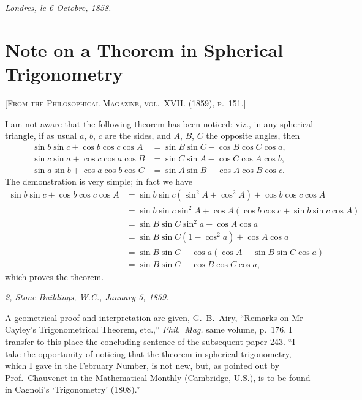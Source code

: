\documentclass[11pt,a4paper]{article}
\begin{document}
\medskip
\noindent\textit{Londres, le 6 Octobre, 1858.}


\newpage


\section{Note on a Theorem in Spherical Trigonometry}
\label{paper:240}

\textsc{[From the Philosophical Magazine, vol.~XVII. (1859), p.~151.]}

\setcounter{page}{80}

I am not aware that the following theorem has been noticed: viz., in any spherical triangle, if as usual $a$, $b$, $c$ are the sides, and $A$, $B$, $C$ the opposite angles, then
\[
\begin{aligned}
\sin b \sin c + \cos b \cos c \cos A &= \sin B \sin C - \cos B \cos C \cos a, \\
\sin c \sin a + \cos c \cos a \cos B &= \sin C \sin A - \cos C \cos A \cos b, \\
\sin a \sin b + \cos a \cos b \cos C &= \sin A \sin B - \cos A \cos B \cos c.
\end{aligned}
\]
The demonstration is very simple; in fact we have
\[
\begin{aligned}
\sin b \sin c + \cos b \cos c \cos A
 &= \sin b \sin c (\sin^{2} A + \cos^{2} A) + \cos b \cos c \cos A \\
 &= \sin b \sin c \sin^{2} A + \cos A (\cos b \cos c + \sin b \sin c \cos A) \\
 &= \sin B \sin C \sin^{2} a + \cos A \cos a \\
 &= \sin B \sin C (1 - \cos^{2} a) + \cos A \cos a \\
 &= \sin B \sin C + \cos a (\cos A - \sin B \sin C \cos a) \\
 &= \sin B \sin C - \cos B \cos C \cos a,
\end{aligned}
\]
which proves the theorem.

\medskip
\noindent\textit{2, Stone Buildings, W.C., January 5, 1859.}

\medskip
\noindent\footnotesize A geometrical proof and interpretation are given, G.~B.~Airy, ``Remarks on Mr Cayley's Trigonometrical Theorem, etc.,'' \textit{Phil.\ Mag.} same volume, p.~176. I transfer to this place the concluding sentence of the subsequent paper 243. ``I take the opportunity of noticing that the theorem in spherical trigonometry, which I gave in the February Number, is not new, but, as pointed out by Prof.~Chauvenet in the Mathematical Monthly (Cambridge, U.S.), is to be found in Cagnoli's `Trigonometry' (1808).''\normalsize
\end{document}
